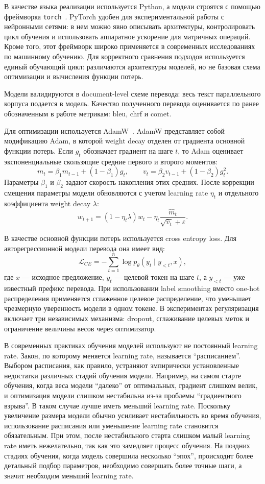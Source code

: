 В качестве языка реализации используется Python, а модели строятся с помощью фреймворка \texttt{torch}~\cite{pytorch}.
PyTorch удобен для экспериментальной работы с нейронными сетями: в нем можно явно описывать архитектуры, контролировать цикл обучения и использовать аппаратное ускорение для матричных операций. Кроме того, этот фреймворк широко применяется в современных исследованиях по машинному обучению.
Для корректного сравнения подходов используется единый обучающий цикл: различаются архитектуры моделей, но не базовая схема оптимизации и вычисления функции потерь.

Модели валидируются в document-level схеме перевода: весь текст параллельного корпуса подается в модель.
Качество полученного перевода оценивается по ранее обозначенным в работе метрикам: bleu, chrf и comet.

Для оптимизации используется AdamW~\cite{adamw}.
AdamW представляет собой модификацию Adam, в которой weight decay отделен от градиента основной функции потерь.
Если $g_t$ обозначает градиент на шаге $t$, то Adam оценивает экспоненциальные скользящие средние первого и второго моментов:
\[
	m_t = \beta_1 m_{t-1} + (1 - \beta_1)g_t,
	\qquad
	v_t = \beta_2 v_{t-1} + (1 - \beta_2)g_t^2.
\]
Параметры $\beta_1$ и $\beta_2$ задают скорость накопления этих средних.
После коррекции смещения параметры модели обновляются с учетом learning rate $\eta_t$ и отдельного коэффициента weight decay $\lambda$:
\[
	w_{t+1} = (1 - \eta_t\lambda)w_t
	- \eta_t\frac{\hat{m}_t}{\sqrt{\hat{v}_t} + \varepsilon}.
\]

В качестве основной функции потерь используется cross entropy loss.
Для авторегрессионной модели перевода она имеет вид:
\[
	\mathcal{L}_{CE} = -\sum_{t=1}^{n}\log p_{\theta}(y_t \mid y_{<t}, x),
\]
где $x$ --- исходное предложение, $y_t$ --- целевой токен на шаге $t$, а $y_{<t}$ --- уже известный префикс перевода.
При использовании label smoothing вместо one-hot распределения применяется сглаженное целевое распределение, что уменьшает чрезмерную уверенность модели в одном токене.
В экспериментах регуляризация включает три независимых механизма: dropout, сглаживание целевых меток и ограничение величины весов через оптимизатор.

В современных практиках обучения моделей используют не постоянный learning rate. Закон, по которому меняется learning rate, называется ``расписанием''.
Выбором расписания, как правило, устраняют эмпирически установленные недостатки различных стадий обучения модели.
Например, на самом старте обучения, когда веса модели ``далеко'' от оптимальных, градиент слишком велик, и оптимизация модели слишком нестабильна из-за проблемы ``градиентного взрыва''.
В таком случае лучше иметь меньший learning rate. Поскольку увеличение размера модели обычно усиливает нестабильность во время обучения, использование расписания или уменьшение learning rate становится обязательным.
При этом, после нестабильного старта слишком малый learning rate иметь нежелательно, так как это замедляет процесс обучения. На поздних стадиях обучения, когда модель совершила несколько ``эпох'', происходит более детальный подбор параметров, необходимо совершать более точные шаги, а значит необходим меньший learning rate.

